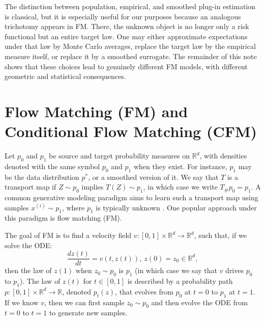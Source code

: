 \documentclass[a4paper,11pt]{article}
\newcommand{\R}{\mathbb{R}}
\theoremstyle{plain}
\theoremstyle{definition}
\begin{document}
The distinction between population, empirical, and smoothed plug-in estimation is classical, but it is especially useful for our purposes because an analogous trichotomy appears in FM. There, the unknown object is no longer only a risk functional but an entire target law. One may either approximate expectations under that law by Monte Carlo averages, replace the target law by the empirical measure itself, or replace it by a smoothed surrogate. The remainder of this note shows that these choices lead to genuinely different FM models, with different geometric and statistical consequences.

\section{Flow Matching (FM) and Conditional Flow Matching (CFM)} \label{sec:background}
Let $p_0$ and $p_1$ be source and target probability measures on $\mathbb R^d$, with densities denoted with the same symbol $p_0$ and $p_1$ when they exist. For instance, \(p_1\) may be the data distribution \(p^*\), or a smoothed version of it. We say that \(T\) is a transport map if \(Z\sim p_0\) implies \(T(Z)\sim p_1\), in which case we write \(T_{\#}p_0=p_1\). 
A common generative modeling paradigm aims to learn such a transport map using samples \(x^{(i)}\sim p_1\), where \(p_1\) is typically unknown  \cite{peyre2025optimal}. One popular approach under this paradigm is flow matching (FM).

 The goal of FM is to find a velocity field $v: [0,1] \times  \R^d \to \R^d$, such that, if we solve the ODE:
$$\frac{dz(t)}{dt} = v(t, z(t)), \  z(0) = z_0 \in \R^d,$$ then the law of $z(1)$ when $z_0 \sim p_0$ is $p_1$ (in which case we say that $v$ drives $p_0$ to $p_1$). The law of $z(t)$ for $t \in [0,1]$ is described by  a probability path $p: [0,1] \times \R^d \to \R$, denoted $p_t(z)$, that evolves from $p_0$ at $t=0$ to $p_1$ at $t=1$. If we know $v$, then we can first sample $z_0 \sim p_0$ and then evolve the ODE from $t=0$ to $t=1$ to generate new samples. 
\end{document}
